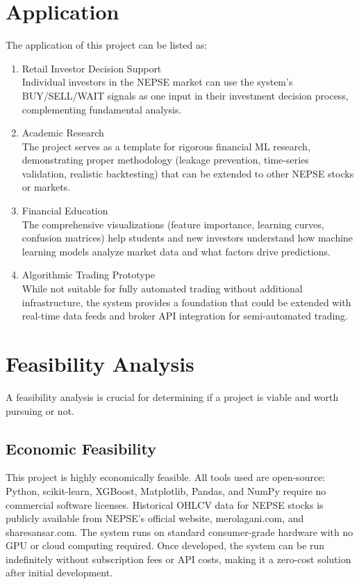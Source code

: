 \documentclass[12pt, a4paper]{report}
\begin{document}
	\section{Application}
	The application of this project can be listed as:
	\begin{enumerate}
		\renewcommand{\labelenumi}{\roman{enumi}.}
		\item Retail Investor Decision Support\\
		Individual investors in the NEPSE market can use the system's BUY/SELL/WAIT signals as one input in their investment decision process, complementing fundamental analysis.
		\item Academic Research\\
		The project serves as a template for rigorous financial ML research, demonstrating proper methodology (leakage prevention, time-series validation, realistic backtesting) that can be extended to other NEPSE stocks or markets.
		\item Financial Education\\
		The comprehensive visualizations (feature importance, learning curves, confusion matrices) help students and new investors understand how machine learning models analyze market data and what factors drive predictions.
		\item Algorithmic Trading Prototype\\
		While not suitable for fully automated trading without additional infrastructure, the system provides a foundation that could be extended with real-time data feeds and broker API integration for semi-automated trading.
	\end{enumerate}
	
	\section{Feasibility Analysis}
	A feasibility analysis is crucial for determining if a project is viable and worth pursuing or not.
	
	\subsection{Economic Feasibility}
	This project is highly economically feasible. All tools used are open-source: Python, scikit-learn, XGBoost, Matplotlib, Pandas, and NumPy require no commercial software licenses. Historical OHLCV data for NEPSE stocks is publicly available from NEPSE's official website, merolagani.com, and sharesansar.com. The system runs on standard consumer-grade hardware with no GPU or cloud computing required. Once developed, the system can be run indefinitely without subscription fees or API costs, making it a zero-cost solution after initial development.
	
\end{document}
